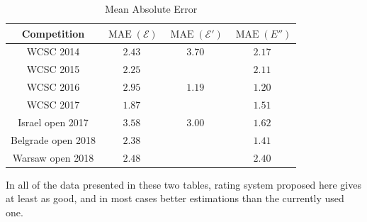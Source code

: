 \documentclass[preprint,12pt]{article}
\newcommand{\E}{\mathcal{E}}
\DeclareMathOperator{\MAE}{MAE}
\begin{document}
\begin{table}[h]
\begin{center}
\begin{tabular}{|c|c|c|c|}
\hline
Competition & $\MAE(\E)$ & $\MAE(\E')$ & $\MAE(E'')$\\
\hline
WCSC 2014 & $2.43$ & $3.70$ & $2.17$\\
\hline
WCSC 2015 & $2.25$ & & $2.11$\\
\hline
WCSC 2016 & $2.95$ & $1.19$ & $1.20$\\
\hline
WCSC 2017 & $1.87$ & & $1.51$\\
\hline
Israel open 2017 & $3.58$ & $3.00$ & $1.62$\\
\hline
Belgrade open 2018 & $2.38$ & & $1.41$\\
\hline
Warsaw open 2018 & $2.48$ & & $2.40$\\
\hline
\end{tabular}
\end{center}\caption{Mean Absolute Error}\label{wcsc_mean_absolute}
\end{table}

In all of the data presented in these two tables,
rating system proposed here gives at least as good,
and in most cases better estimations than the currently used one.
\end{document}
